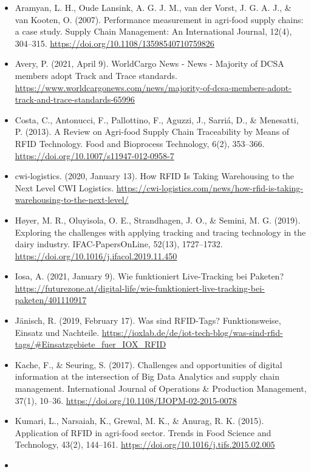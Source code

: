 \documentclass[
]{book}
\providecommand{\tightlist}{%
  \setlength{\itemsep}{0pt}\setlength{\parskip}{0pt}}
\begin{document}
\begin{itemize}
\tightlist
\item
  Aramyan, L. H., Oude Lansink, A. G. J. M., van der Vorst, J. G. A. J., \& van Kooten, O. (2007). Performance measurement in agri‐food supply chains: a case study. Supply Chain Management: An International Journal, 12(4), 304--315. \url{https://doi.org/10.1108/13598540710759826}
\item
  Avery, P. (2021, April 9). WorldCargo News - News - Majority of DCSA members adopt Track and Trace standards. \url{https://www.worldcargonews.com/news/majority-of-dcsa-members-adopt-track-and-trace-standards-65996}
\item
  Costa, C., Antonucci, F., Pallottino, F., Aguzzi, J., Sarriá, D., \& Menesatti, P. (2013). A Review on Agri-food Supply Chain Traceability by Means of RFID Technology. Food and Bioprocess Technology, 6(2), 353--366. \url{https://doi.org/10.1007/s11947-012-0958-7}
\item
  cwi-logistics. (2020, January 13). How RFID Is Taking Warehousing to the Next Level \textbar{} CWI Logistics. \url{https://cwi-logistics.com/news/how-rfid-is-taking-warehousing-to-the-next-level/}
\item
  Høyer, M. R., Oluyisola, O. E., Strandhagen, J. O., \& Semini, M. G. (2019). Exploring the challenges with applying tracking and tracing technology in the dairy industry. IFAC-PapersOnLine, 52(13), 1727--1732. \url{https://doi.org/10.1016/j.ifacol.2019.11.450}
\item
  Iosa, A. (2021, January 9). Wie funktioniert Live-Tracking bei Paketen? \url{https://futurezone.at/digital-life/wie-funktioniert-live-tracking-bei-paketen/401110917}
\item
  Jänisch, R. (2019, February 17). Was sind RFID-Tags? Funktionsweise, Einsatz und Nachteile. \url{https://ioxlab.de/de/iot-tech-blog/was-sind-rfid-tags/\#Einsatzgebiete_fuer_IOX_RFID}
\item
  Kache, F., \& Seuring, S. (2017). Challenges and opportunities of digital information at the intersection of Big Data Analytics and supply chain management. International Journal of Operations \& Production Management, 37(1), 10--36. \url{https://doi.org/10.1108/IJOPM-02-2015-0078}
\item
  Kumari, L., Narsaiah, K., Grewal, M. K., \& Anurag, R. K. (2015). Application of RFID in agri-food sector. Trends in Food Science and Technology, 43(2), 144--161. \url{https://doi.org/10.1016/j.tifs.2015.02.005}
\item

\end{itemize}
\end{document}
